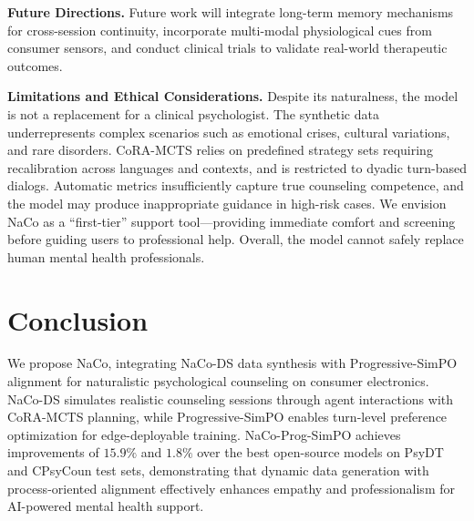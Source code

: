 \documentclass[lettersize,journal]{IEEEtran}
\begin{document}
\textbf{Future Directions.}
Future work will integrate long-term memory mechanisms for cross-session continuity, incorporate multi-modal physiological cues from consumer sensors, and conduct clinical trials to validate real-world therapeutic outcomes.

\textbf{Limitations and Ethical Considerations.}
Despite its naturalness, the model is not a replacement for a clinical psychologist. The synthetic data underrepresents complex scenarios such as emotional crises, cultural variations, and rare disorders. CoRA-MCTS relies on predefined strategy sets requiring recalibration across languages and contexts, and is restricted to dyadic turn-based dialogs. Automatic metrics insufficiently capture true counseling competence, and the model may produce inappropriate guidance in high-risk cases. We envision NaCo as a ``first-tier'' support tool---providing immediate comfort and screening before guiding users to professional help. Overall, the model cannot safely replace human mental health professionals.

\section{Conclusion}
We propose NaCo, integrating NaCo-DS data synthesis with Progressive-SimPO alignment for naturalistic psychological counseling on consumer electronics. NaCo-DS simulates realistic counseling sessions through agent interactions with CoRA-MCTS planning, while Progressive-SimPO enables turn-level preference optimization for edge-deployable training. NaCo-Prog-SimPO achieves improvements of $15.9\%$ and $1.8\%$ over the best open-source models on PsyDT and CPsyCoun test sets, demonstrating that dynamic data generation with process-oriented alignment effectively enhances empathy and professionalism for AI-powered mental health support.



\end{document}
